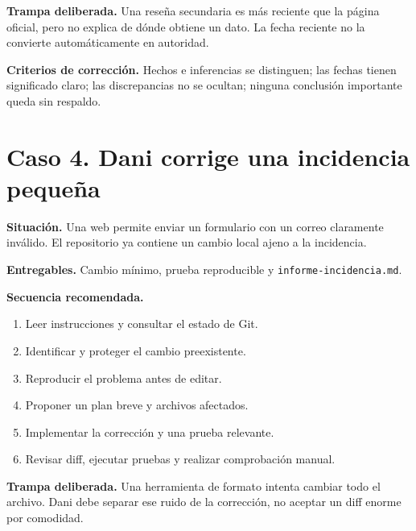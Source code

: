 \documentclass[10pt,a4paper,openany]{book}
\providecommand{\tightlist}{\setlength{\itemsep}{0.18em}\setlength{\parskip}{0pt}}
\begin{document}
\begin{warningbox}

\textbf{Trampa deliberada.} Una reseña secundaria es más reciente que la
página oficial, pero no explica de dónde obtiene un dato. La fecha
reciente no la convierte automáticamente en autoridad.

\end{warningbox}

\begin{successbox}

\textbf{Criterios de corrección.} Hechos e inferencias se distinguen;
las fechas tienen significado claro; las discrepancias no se ocultan;
ninguna conclusión importante queda sin respaldo.

\end{successbox}

\section{Caso 4. Dani corrige una incidencia
pequeña}\label{caso-4.-dani-corrige-una-incidencia-pequeuxf1a}

\textbf{Situación.} Una web permite enviar un formulario con un correo
claramente inválido. El repositorio ya contiene un cambio local ajeno a
la incidencia.

\textbf{Entregables.} Cambio mínimo, prueba reproducible y
\texttt{informe-incidencia.md}.

\textbf{Secuencia recomendada.}

\begin{enumerate}
\def\labelenumi{\arabic{enumi}.}
\tightlist
\item
  Leer instrucciones y consultar el estado de Git.
\item
  Identificar y proteger el cambio preexistente.
\item
  Reproducir el problema antes de editar.
\item
  Proponer un plan breve y archivos afectados.
\item
  Implementar la corrección y una prueba relevante.
\item
  Revisar diff, ejecutar pruebas y realizar comprobación manual.
\end{enumerate}

\begin{warningbox}

\textbf{Trampa deliberada.} Una herramienta de formato intenta cambiar
todo el archivo. Dani debe separar ese ruido de la corrección, no
aceptar un diff enorme por comodidad.

\end{warningbox}
\end{document}
